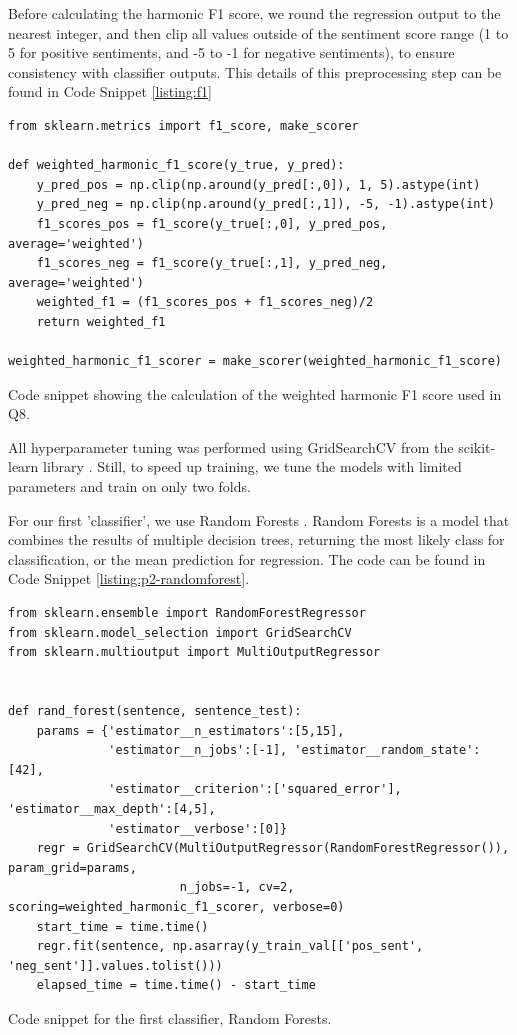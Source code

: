 Before calculating the harmonic F1 score, we round the regression output to the nearest integer, and then clip all values outside of the sentiment score range (1 to 5 for positive sentiments, and -5 to -1 for negative sentiments), to ensure consistency with classifier outputs. This details of this preprocessing step can be found in Code Snippet \ref{listing:f1}

\begin{listing*}
\begin{verbatim}
from sklearn.metrics import f1_score, make_scorer

def weighted_harmonic_f1_score(y_true, y_pred):
    y_pred_pos = np.clip(np.around(y_pred[:,0]), 1, 5).astype(int)
    y_pred_neg = np.clip(np.around(y_pred[:,1]), -5, -1).astype(int)
    f1_scores_pos = f1_score(y_true[:,0], y_pred_pos, average='weighted')
    f1_scores_neg = f1_score(y_true[:,1], y_pred_neg, average='weighted')
    weighted_f1 = (f1_scores_pos + f1_scores_neg)/2
    return weighted_f1

weighted_harmonic_f1_scorer = make_scorer(weighted_harmonic_f1_score)

\end{verbatim}
\caption{Code snippet showing the calculation of the weighted harmonic F1 score used in Q8.}
\label{listing:f1}
\end{listing*}


All hyperparameter tuning was performed using GridSearchCV from the scikit-learn library \cite{sklearn1, sklearn2}. Still, to speed up training, we tune the models with limited parameters and train on only two folds.

For our first 'classifier', we use Random Forests \cite{randomforest}. Random Forests is a model that combines the results of multiple decision trees, returning the most likely class for classification, or the mean prediction for regression. The code can be found in Code Snippet \ref{listing:p2-randomforest}.

\begin{listing*}
\begin{verbatim}
from sklearn.ensemble import RandomForestRegressor
from sklearn.model_selection import GridSearchCV
from sklearn.multioutput import MultiOutputRegressor


def rand_forest(sentence, sentence_test):
    params = {'estimator__n_estimators':[5,15],
              'estimator__n_jobs':[-1], 'estimator__random_state':[42],
              'estimator__criterion':['squared_error'], 'estimator__max_depth':[4,5],
              'estimator__verbose':[0]}
    regr = GridSearchCV(MultiOutputRegressor(RandomForestRegressor()), param_grid=params,
                        n_jobs=-1, cv=2, scoring=weighted_harmonic_f1_scorer, verbose=0)
    start_time = time.time()
    regr.fit(sentence, np.asarray(y_train_val[['pos_sent', 'neg_sent']].values.tolist()))
    elapsed_time = time.time() - start_time

\end{verbatim}
\caption{Code snippet for the first classifier, Random Forests.}
\label{listing:p2-randomforest}
\end{listing*}

